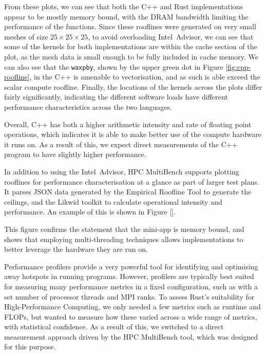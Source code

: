 From these plots, we can see that both the C++ and Rust implementations appear to be mostly memory bound, with the DRAM bandwidth limiting the performance of the functions. Since these rooflines were generated on very small meshes of size $25 \times 25 \times 25$, to avoid overloading Intel\textregistered\ Advisor, we can see that some of the kernels for both implementations are within the cache section of the plot, as the mesh data is small enough to be fully included in cache memory. We can also see that the \texttt{waxpby}, shown by the upper green dot in Figure \ref{fig:cpp-roofline}, in the C++ is amenable to vectorisation, and as such is able exceed the scalar compute roofline. Finally, the locations of the kernels across the plots differ fairly significantly, indicating the different software loads have different performance characteristics across the two languages.

Overall, C++ has both a higher arithmetic intensity and rate of floating point operations, which indicates it is able to make better use of the compute hardware it runs on. As a result of this, we expect direct measurements of the C++ program to have slightly higher performance.

In addition to using the Intel\textregistered\ Advisor, HPC MultiBench supports plotting rooflines for performance characterisation at a glance as part of larger test plans. It parses JSON data generated by the Empirical Roofline Tool \cite{EmpiricalRooflineTool} to generate the ceilings, and the Likwid toolkit \cite{RRZEHPCLikwid2024} to calculate operational intensity and performance. An example of this is shown in Figure \ref{}.


This figure confirms the statement that the mini-app is memory bound, and shows that employing multi-threading techniques allows implementations to better leverage the hardware they are run on.

Performance profilers provide a very powerful tool for identifying and optimising away hotspots in running programs. However, profilers are typically best suited for measuring many performance metrics in a fixed configuration, such as with a set number of processor threads and MPI ranks. To assess Rust's suitability for High-Performance Computing, we only needed a few metrics such as runtime and FLOPs, but wanted to measure how these varied across a wide range of metrics, with statistical confidence. As a result of this, we switched to a direct measurement approach driven by the HPC MultiBench tool, which was designed for this purpose.

